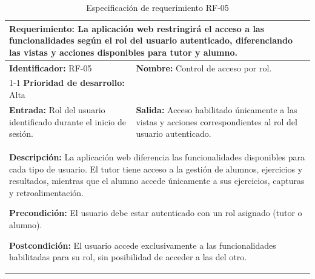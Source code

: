 \begin{table}[H]
\caption{Especificación de requerimiento RF-05}
\centering
\renewcommand{\arraystretch}{1.3}
\setlength{\tabcolsep}{6pt}
\begin{tabular}{|p{7cm}|p{8cm}|}
\hline
\multicolumn{2}{|p{15cm}|}{\textbf{Requerimiento:} La aplicación web restringirá el acceso a las funcionalidades según el rol del usuario autenticado, diferenciando las vistas y acciones disponibles para tutor y alumno.} \\ \hline
\textbf{Identificador:} RF-05 &
\textbf{Nombre:} Control de acceso por rol. \\ \cline{1-1}
\textbf{Prioridad de desarrollo:} Alta &
\multicolumn{1}{p{8cm}|}{} \\ \hline
\textbf{Entrada:} Rol del usuario identificado durante el inicio de sesión. &
\textbf{Salida:} Acceso habilitado únicamente a las vistas y acciones correspondientes al rol del usuario autenticado. \\ \hline
\multicolumn{2}{|p{15cm}|}{
\textbf{Descripción:} La aplicación web diferencia las funcionalidades disponibles para cada tipo de usuario. El tutor tiene acceso a la gestión de alumnos, ejercicios y resultados, mientras que el alumno accede únicamente a sus ejercicios, capturas y retroalimentación.

\vspace{0.2cm}

\textbf{Precondición:} El usuario debe estar autenticado con un rol asignado (tutor o alumno).


\vspace{0.2cm}

\textbf{Postcondición:} El usuario accede exclusivamente a las funcionalidades habilitadas para su rol, sin posibilidad de acceder a las del otro.
} \\ \hline
\end{tabular}
\label{tab:rf05}
\end{table}

